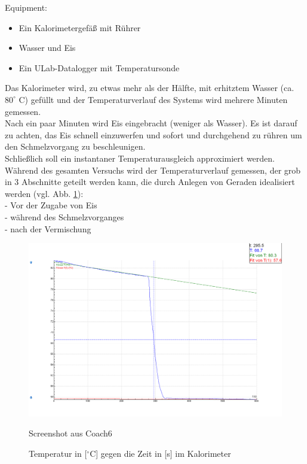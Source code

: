 \documentclass[12pt,a4paper]{article}
\begin{document}
\begin{multicols}{2}
\noindent Equipment:
\begin {itemize}
	\item Ein Kalorimetergefäß mit Rührer
	\item Wasser und Eis
	\item Ein ULab-Datalogger mit Temperatursonde
\end {itemize}

Das Kalorimeter wird, zu etwas mehr als der Hälfte, mit erhitztem Wasser (ca. $80^{\circ}$ C) gefüllt und der Temperaturverlauf des Systems wird mehrere Minuten gemessen.\\
Nach ein paar Minuten wird Eis eingebracht (weniger als Wasser). Es ist darauf zu achten, das Eis schnell einzuwerfen und sofort und durchgehend zu rühren um den Schmelzvorgang zu beschleunigen.\\
Schließlich soll ein instantaner Temperaturausgleich approximiert werden.\\
Während des gesamten Versuchs wird der Temperaturverlauf gemessen, der grob in 3 Abschnitte geteilt werden kann, die durch Anlegen von Geraden idealisiert werden (vgl. Abb. \ref{fig:Tempverlauf-Eis}):\\
- Vor der Zugabe von Eis\\
- während des Schmelzvorganges\\
- nach der Vermischung


\end{multicols}

\begin{figure}[H]
	\centering
	\includegraphics[scale=0.35]{./figure/PW4_graph.PNG}
	\caption{Temperatur in [$^\circ$C] gegen die Zeit in [s] im Kalorimeter\ }
	{\centering Screenshot aus Coach6}
	\label{fig:Tempverlauf-Eis}
\end{figure}
\noindent
\end{document}
